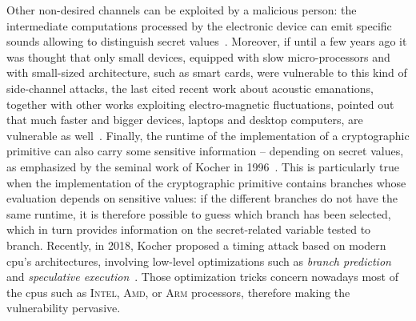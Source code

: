 Other non-desired channels can be exploited by a malicious person: the intermediate computations processed by the electronic device can emit specific sounds allowing to distinguish secret values~\cite{genkin_rsa_2014}.
Moreover, if until a few years ago it was thought that only small devices, equipped with slow micro-processors and with small-sized architecture, such as smart cards, were vulnerable to this kind of side-channel attacks, the last cited recent work about acoustic emanations, together with other works exploiting electro-magnetic fluctuations, pointed out that much faster and bigger devices, \ie{} laptops and desktop computers, are vulnerable as well~\cite{genkin_get_2015,genkin_stealing_2015,genkin_ecdh_2016}.
Finally, the runtime of the implementation of a cryptographic primitive can also carry some sensitive information -- \ie{} depending on secret values, as emphasized by the seminal work of Kocher in 1996~\cite{kocher_timing_1996}.
This is particularly true when the implementation of the cryptographic primitive contains branches whose evaluation depends on sensitive values: if the different branches do not have the same runtime, it is therefore possible to guess which branch has been selected, which in turn provides information on the secret-related variable tested to branch.
Recently, in 2018, Kocher \etal{} proposed a timing attack based on modern \gls{cpu}'s architectures, involving low-level optimizations such as \emph{branch prediction} and \emph{speculative execution}~\cite{kocher_spectre_2018}.
Those optimization tricks concern nowadays most of the \glspl{cpu} such as \textsc{Intel}, \textsc{Amd}, or \textsc{Arm} processors, therefore making the vulnerability pervasive.
